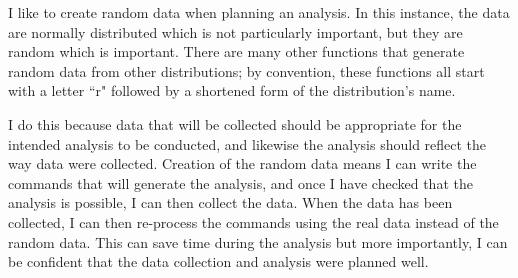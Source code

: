 I like to create random data when planning an analysis. In this instance, the data are normally distributed which is not particularly important, but they are random which is important. There are many other functions that generate random data from other distributions; by convention, these functions all start with a letter ``r" followed by a shortened form of the distribution's name.  
 
I do this because data that will  be collected should be appropriate for the intended analysis to be conducted, and likewise the analysis should reflect the way data were collected. Creation of the random data means I can write the \R{} commands that will generate the analysis, and once I have checked that the analysis is possible, I can then collect the data. When the data has been collected, I can then re-process the commands using the real data instead of the  random data. This can save time during the analysis but more importantly, I can be confident that the data collection and analysis were planned well. 
 
 

